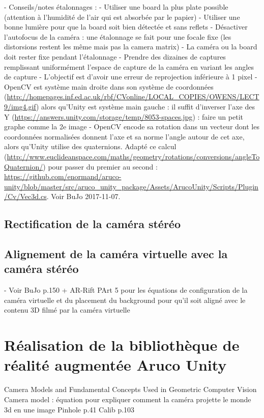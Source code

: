 - Conseils/notes étalonnages :
  - Utiliser une board la plus plate possible (attention à l'humidité de l'air qui est absorbée par le papier)
  - Utiliser une bonne lumière pour que la board soit bien détectée et sans reflets
  - Désactiver l'autofocus de la caméra : une étalonnage se fait pour une focale fixe (les distorsions restent les même mais pas la camera matrix)
  - La caméra ou la board doit rester fixe pendant l'étalonnage
  - Prendre des dizaines de captures remplissant uniformément l'espace de capture de la caméra en variant les angles de capture
  - L'objectif est d'avoir une erreur de reprojection inférieure à 1 pixel
  - OpenCV est système main droite dans son système de coordonnées (\url{http://homepages.inf.ed.ac.uk/rbf/CVonline/LOCAL_COPIES/OWENS/LECT9/img4.gif}) alors qu'Unity est système main gauche : il suffit d'inverser l'axe des Y (\url{https://answers.unity.com/storage/temp/8053-spaces.jpg}) : faire un petit graphe comme la 2e image
  - OpenCV encode sa rotation dans un vecteur dont les coordonnées normalisées donnent l'axe et sa norme l'angle autour de cet axe, alors qu'Unity utilise des quaternions. Adapté ce calcul (\url{http://www.euclideanspace.com/maths/geometry/rotations/conversions/angleToQuaternion/}) pour passer du premier au second : \url{https://github.com/enormand/aruco-unity/blob/master/src/aruco_unity_package/Assets/ArucoUnity/Scripts/Plugin/Cv/Vec3d.cs}. Voir BuJo 2017-11-07.

\subsection{Rectification de la caméra stéréo}

\subsection{Alignement de la caméra virtuelle avec la caméra stéréo}
- Voir BuJo p.150 + AR-Rift PArt 5 pour les équations de configuration de la caméra virtuelle et du placement du background pour qu'il soit aligné avec le contenu 3D filmé par la caméra virtuelle


\section{Réalisation de la bibliothèque de réalité augmentée Aruco Unity}
Camera Models and Fundamental Concepts Used in Geometric Computer Vision
Camera model : équation pour expliquer comment la caméra projette le monde 3d en une image
Pinhole p.41
Calib p.103

